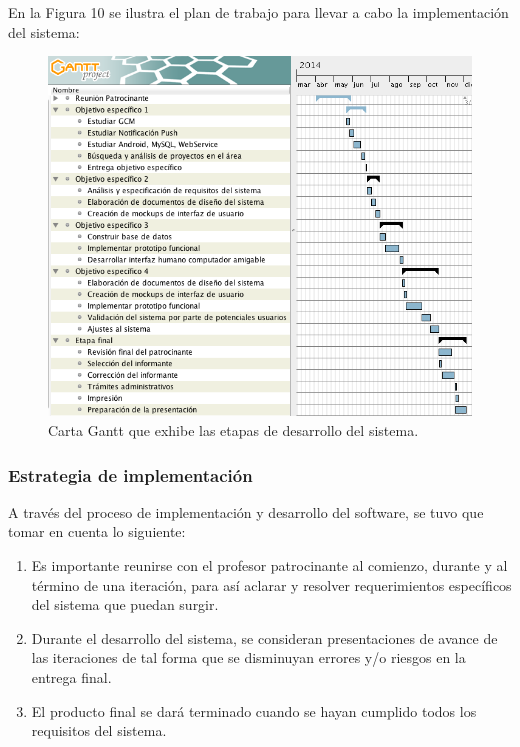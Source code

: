 En la Figura 10 se ilustra el plan de trabajo para llevar a cabo la implementación del sistema:

\begin{figure}[H]
\centering
\includegraphics[scale=0.65]{images/capitulo4/gantt.png}
\caption{Carta Gantt que exhibe las etapas de desarrollo del sistema.}
\label{gantt}
\end{figure}


\subsubsection{Estrategia de implementación}

A través del proceso de implementación y desarrollo del software, se tuvo que tomar en cuenta lo siguiente:

\begin{enumerate}
\item Es importante reunirse con el profesor patrocinante al comienzo, durante y al término de una iteración, para así aclarar y resolver requerimientos específicos del sistema que puedan surgir.
\item Durante el desarrollo del sistema, se consideran presentaciones de avance de las iteraciones de tal forma que se disminuyan errores y/o riesgos en la entrega final.
\item El producto final se dará terminado cuando se hayan cumplido todos los requisitos del sistema.
\end{enumerate}

